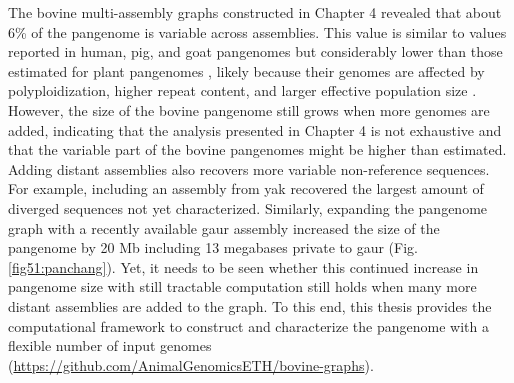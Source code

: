 \documentclass[../main.tex]{subfiles}
\begin{document}
The bovine multi-assembly graphs constructed in Chapter 4 revealed that about 6\% of the pangenome is variable across assemblies. This value is similar to values reported in human, pig, and goat pangenomes \citep{li2017comprehensive,li2019towards,duan2019hupan} but considerably lower than those estimated for plant pangenomes \citep{golicz2016pangenome,gordon2017extensive,gao2019tomato}, likely because their genomes are affected by polyploidization, higher repeat content, and larger effective population size \citep{lei2021plant}. However, the size of the bovine pangenome still grows when more genomes are added, indicating that the analysis presented in Chapter 4 is not exhaustive and that the variable part of the bovine pangenomes might be higher than estimated. Adding  distant assemblies also recovers more variable non-reference sequences. For example, including an assembly from yak recovered the largest amount of diverged sequences not yet characterized. Similarly, expanding the pangenome graph with a recently available gaur assembly increased the size of the pangenome by 20 Mb including 13 megabases private to gaur (Fig. \ref{fig51:panchang}). Yet, it needs to be seen whether this continued increase in pangenome size with still tractable computation still holds when many more distant assemblies are added to the graph. To this end, this thesis provides the computational framework to construct and characterize the pangenome with a flexible number of input genomes (\url{https://github.com/AnimalGenomicsETH/bovine-graphs}). 
\end{document}
